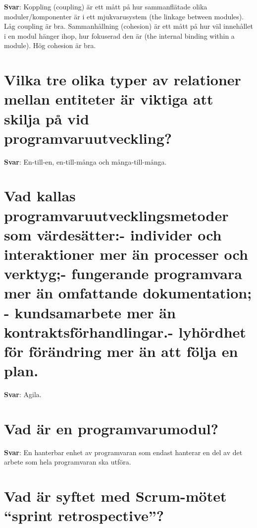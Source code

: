 \documentclass[a4paper,11pt,oneside]{book}
\begin{document}
\begin{sloppypar}
\label{q:239:sa:sv:True}

\textbf{Svar}: Koppling (coupling) \"ar ett m\r{a}tt p\r{a} hur sammanfl\"atade olika moduler/komponenter \"ar i ett mjukvarusystem (the linkage between modules). L\r{a}g coupling \"ar bra. Sammanh\r{a}llning (cohesion) \"ar ett m\r{a}tt p\r{a} hur v\"al inneh\r{a}llet i en modul h\"anger ihop, hur fokuserad den \"ar (the internal binding within a module). H\"og cohesion \"ar bra.



\section{Vilka tre olika typer av relationer mellan entiteter \"ar viktiga att skilja p\r{a} vid programvaruutveckling?}

\label{q:240:sa:sv:True}

\textbf{Svar}: En-till-en, en-till-m\r{a}nga och m\r{a}nga-till-m\r{a}nga.



\section{Vad kallas programvaruutvecklingsmetoder som v\"ardes\"atter:- individer och interaktioner mer \"an processer och verktyg;- fungerande programvara mer \"an omfattande dokumentation; - kundsamarbete mer \"an kontraktsf\"orhandlingar.- lyh\"ordhet f\"or f\"or\"andring mer \"an att f\"olja en plan.}

\label{q:241:sa:sv:True}

\textbf{Svar}: Agila.



\section{Vad \"ar en programvarumodul?}

\label{q:242:sa:sv:True}

\textbf{Svar}: En hanterbar enhet av programvaran som endast hanterar en del av det arbete som hela programvaran ska utf\"ora.



\section{Vad \"ar syftet med Scrum-m\"otet {\textquotedblleft}sprint retrospective{\textquotedblright}?}

\label{q:243:sa:sv:True}


\end{sloppypar}
\end{document}
